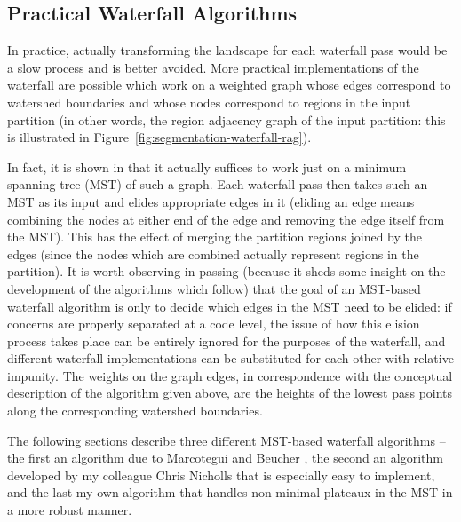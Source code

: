 \subsection{Practical Waterfall Algorithms}
\label{subsec:segmentation-waterfall-practicalalgorithms}

In practice, actually transforming the landscape for each waterfall pass would be a slow process and is better avoided. More practical implementations of the waterfall are possible which work on a weighted graph whose edges correspond to watershed boundaries and whose nodes correspond to regions in the input partition (in other words, the region adjacency graph of the input partition: this is illustrated in Figure~\ref{fig:segmentation-waterfall-rag}).


In fact, it is shown in \cite{marcotegui05} that it actually suffices to work just on a minimum spanning tree (MST) of such a graph. Each waterfall pass then takes such an MST as its input and elides appropriate edges in it (eliding an edge means combining the nodes at either end of the edge and removing the edge itself from the MST). This has the effect of merging the partition regions joined by the edges (since the nodes which are combined actually represent regions in the partition). It is worth observing in passing (because it sheds some insight on the development of the algorithms which follow) that the goal of an MST-based waterfall algorithm is only to decide which edges in the MST need to be elided: if concerns are properly separated at a code level, the issue of how this elision process takes place can be entirely ignored for the purposes of the waterfall, and different waterfall implementations can be substituted for each other with relative impunity. The weights on the graph edges, in correspondence with the conceptual description of the algorithm given above, are the heights of the lowest pass points along the corresponding watershed boundaries.

The following sections describe three different MST-based waterfall algorithms -- the first an algorithm due to Marcotegui and Beucher \cite{marcotegui05}, the second an algorithm developed by my colleague Chris Nicholls \cite{nicholls09} that is especially easy to implement, and the last my own algorithm that handles non-minimal plateaux in the MST in a more robust manner.

